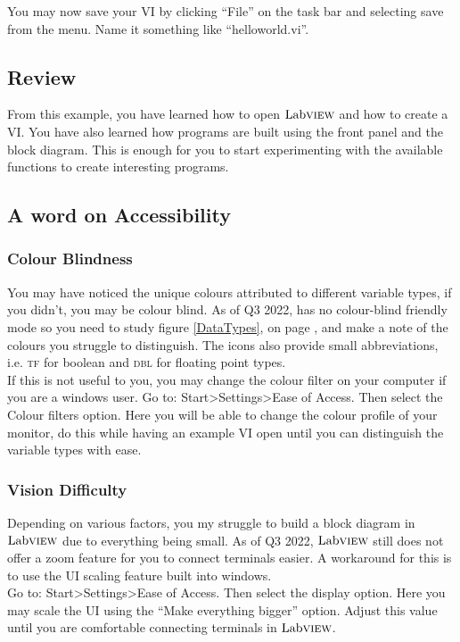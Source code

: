 	You may now save your VI by clicking ``File'' on the task bar and selecting save from the menu. Name it something like ``helloworld.vi''.
	
	\subsection{Review}
	From this example, you have learned how to open $\text{Lab}\textsc{view}$ and how to create a VI. You have also learned how programs are built using the front panel and the block diagram. This is enough for you to start experimenting with the available functions to create interesting programs.
	
	\subsection{A word on Accessibility}
	\subsubsection{Colour Blindness}
	You may have noticed the unique colours attributed to different variable types, if you didn't, you may be colour blind. As of Q3 2022, \labview has no colour-blind friendly mode so you need to study figure \ref{DataTypes}, on page \pageref{DataTypes}, and make a note of the colours you struggle to distinguish. The icons also provide small abbreviations, i.e.  \textsc{tf} for boolean and \textsc{dbl} for floating point types.\\
	
	If this is not useful to you, you may change the colour filter on your computer if you are a windows user. Go to: Start\textgreater Settings\textgreater Ease of Access. Then select the Colour filters option. Here you will be able to change the colour profile of your monitor, do this while having an example VI open until you can distinguish the variable types with ease.
	\subsubsection{Vision Difficulty}
	Depending on various factors, you my struggle to build a block diagram in $\text{Lab}\textsc{view}$ due to everything being small. As of Q3 2022, $\text{Lab}\textsc{view}$ still does not offer a zoom feature for you to connect terminals easier. A workaround for this is to use the UI scaling feature built into windows.\\
	Go to: Start\textgreater Settings\textgreater Ease of Access. Then select the display option. Here you may scale the UI using the ``Make everything bigger'' option. Adjust this value until you are comfortable connecting terminals in $\text{Lab}\textsc{view}$.
	
